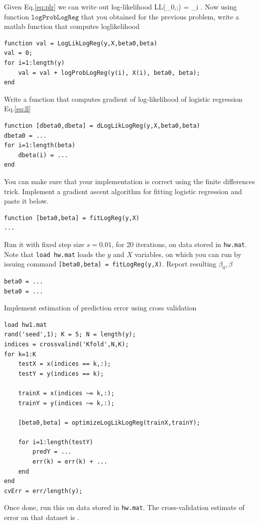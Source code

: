 \documentclass{article}
\begin{document}
\newproblem{1pt}
Given Eq.\eqref{eq:plr} we can write out log-likelihood
\BEQ \label{eq:ll}
\textrm{LL}(\beta_0,\beta;) = \sum_i \log {}.
\EEQ
Now using function $\texttt{logProbLogReg}$ that you obtained for the previous problem, write a matlab function that computes loglikelihood
\begin{verbatim}
function val = LogLikLogReg(y,X,beta0,beta)
val = 0;
for i=1:length(y)
    val = val + logProbLogReg(y(i), X(i), beta0, beta);
end
\end{verbatim}
\newproblem{1pt}
Write a function that computes gradient of log-likelihood of logistic regression Eq.\eqref{eq:ll}
\begin{verbatim}
function [dbeta0,dbeta] = dLogLikLogReg(y,X,beta0,beta)
dbeta0 = ...
for i=1:length(beta)
    dbeta(i) = ...
end
\end{verbatim}
You can make sure that your implementation is correct using the finite differences trick.
\newproblem{1pt}
Implement a gradient ascent algorithm for fitting logistic regression and paste it below.
\begin{verbatim}
function [beta0,beta] = fitLogReg(y,X)
...
\end{verbatim}
Run it with fixed step size $s=0.01$, for 20 iterations, on data stored in \texttt{hw\theHW.mat}.
Note that \texttt{load hw\theHW.mat} loads the $y$ and $X$ variables, on which you can run by issuing command
\texttt{[beta0,beta] = fitLogReg(y,X)}.
Report resulting $\beta_0,\beta$
\begin{verbatim}
beta0 = ...
beta0 = ...
\end{verbatim}
\newproblem{1pt}
Implement estimation of prediction error using cross validation
\begin{verbatim}
load hw1.mat
rand('seed',1); K = 5; N = length(y);
indices = crossvalind('Kfold',N,K);
for k=1:K
    testX = x(indices == k,:);
    testY = y(indices == k);

    trainX = x(indices ~= k,:);
    trainY = y(indices ~= k,:);

    [beta0,beta] = optimizeLogLikLogReg(trainX,trainY);

    for i=1:length(testY)
        predY = ...
        err(k) = err(k) + ...
    end
end
cvErr = err/length(y);
\end{verbatim}
Once done, run this on data stored in \texttt{hw\theHW.mat}. The cross-validation estimate of error on that dataset is \answer.
\end{document}
